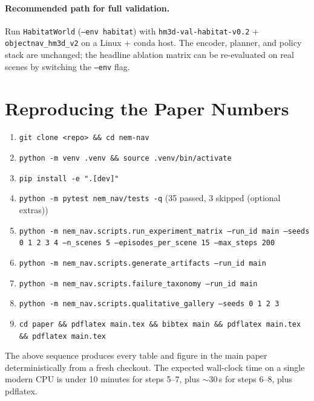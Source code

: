 \documentclass[conference,a4paper,10pt]{IEEEtran}
\begin{document}
\paragraph{Recommended path for full validation.}
Run \texttt{HabitatWorld} (\texttt{--env habitat}) with
\texttt{hm3d-val-habitat-v0.2} + \texttt{objectnav\_hm3d\_v2} on a
Linux + conda host. The encoder, planner, and policy stack are
unchanged; the headline ablation matrix can be re-evaluated on real
scenes by switching the \texttt{--env} flag.

\section{Reproducing the Paper Numbers}
\label{app:repro}

\begin{enumerate}[leftmargin=*]
\item \texttt{git clone <repo> \&\& cd nem-nav}
\item \texttt{python -m venv .venv \&\& source .venv/bin/activate}
\item \texttt{pip install -e ".[dev]"}
\item \texttt{python -m pytest nem\_nav/tests -q} \quad
      (35 passed, 3 skipped (optional extras))
\item \texttt{python -m nem\_nav.scripts.run\_experiment\_matrix
      --run\_id main --seeds 0 1 2 3 4 --n\_scenes 5
      --episodes\_per\_scene 15 --max\_steps 200}
\item \texttt{python -m nem\_nav.scripts.generate\_artifacts --run\_id main}
\item \texttt{python -m nem\_nav.scripts.failure\_taxonomy --run\_id main}
\item \texttt{python -m nem\_nav.scripts.qualitative\_gallery --seeds 0 1 2 3}
\item \texttt{cd paper \&\& pdflatex main.tex \&\& bibtex main \&\&
      pdflatex main.tex \&\& pdflatex main.tex}
\end{enumerate}

The above sequence produces every table and figure in the main paper
deterministically from a fresh checkout. The expected wall-clock time
on a single modern CPU is under 10 minutes for steps 5--7, plus
$\sim$30\,s for steps 6--8, plus pdflatex.
\end{document}
